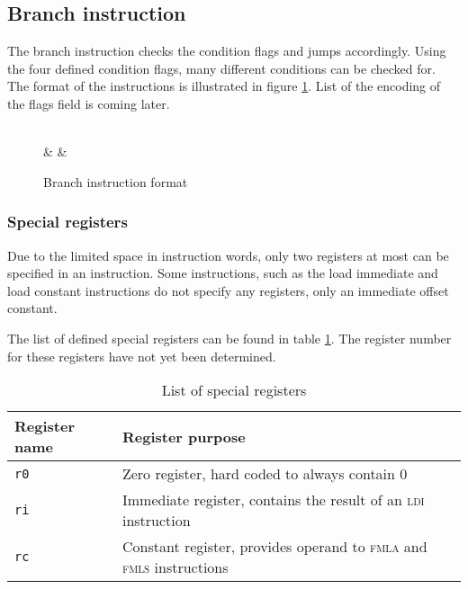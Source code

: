 \subsection{Branch instruction}
The branch instruction checks the condition flags and jumps accordingly. Using the four defined condition flags,
many different conditions can be checked for. The format of the instructions is illustrated in figure \ref{fig:new_branch_format}.
List of the encoding of the flags field is coming later.

\begin{figure}[h]
	\centering
	\begin{bytefield}[endianness=big,bitwidth=0.05\linewidth]{16}
		 \\
		 &
		 &
	\end{bytefield}

	\caption{Branch instruction format}
	\label{fig:new_branch_format}
\end{figure}


\subsubsection{Special registers}

Due to the limited space in instruction words, only two registers at most can be specified in an instruction.
Some instructions, such as the load immediate and load constant instructions do not specify any registers,
only an immediate offset constant.

The list of defined special registers can be found in table \ref{tab:specregs}. The register number for these
registers have not yet been determined.

\begin{table}[h]
	\centering
	\begin{tabular}{|l l|}
		\hline
		\textbf{Register name} & \textbf{Register purpose} \\
		\hline
		\texttt{r0} & Zero register, hard coded to always contain 0 \\
		\texttt{ri} & Immediate register, contains the result of an \textsc{ldi} instruction\\
		\texttt{rc} & Constant register, provides operand to \textsc{fmla} and \textsc{fmls} instructions \\
		\hline
	\end{tabular}

	\caption{List of special registers}
	\label{tab:specregs}
\end{table}

